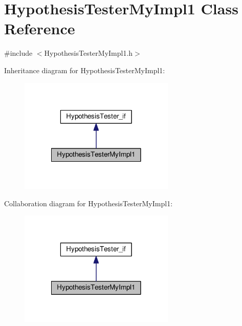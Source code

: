 \hypertarget{class_hypothesis_tester_my_impl1}{\section{Hypothesis\-Tester\-My\-Impl1 Class Reference}
\label{class_hypothesis_tester_my_impl1}
}


{\ttfamily \#include $<$Hypothesis\-Tester\-My\-Impl1.\-h$>$}



Inheritance diagram for Hypothesis\-Tester\-My\-Impl1\-:\nopagebreak
\begin{figure}[H]
\begin{center}
\leavevmode
\includegraphics[width=210pt]{class_hypothesis_tester_my_impl1__inherit__graph}
\end{center}
\end{figure}


Collaboration diagram for Hypothesis\-Tester\-My\-Impl1\-:\nopagebreak
\begin{figure}[H]
\begin{center}
\leavevmode
\includegraphics[width=210pt]{class_hypothesis_tester_my_impl1__coll__graph}
\end{center}
\end{figure}
